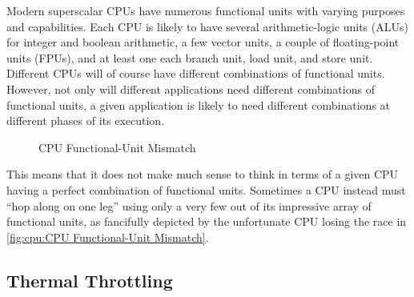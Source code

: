 Modern superscalar CPUs have numerous functional units with varying
purposes and capabilities.
Each CPU is likely to have several arithmetic-logic units (ALUs)
for integer and boolean arithmetic, a few vector units, a couple of
floating-point units (FPUs), and at least one each branch unit, load unit,
and store unit.
Different CPUs will of course have different combinations of functional
units.
However, not only will different applications need different combinations
of functional units, a given application is likely to need different
combinations at different phases of its execution.

\begin{figure}
\centering
{}
\caption{CPU Functional-Unit Mismatch}
\end{figure}

This means that it does not make much sense to think in terms of a given
CPU having a perfect combination of functional units.
Sometimes a CPU instead must ``hop along on one leg'' using only a
very few out of its impressive array of functional units, as fancifully
depicted by the unfortunate CPU losing the race in
\cref{fig:cpu:CPU Functional-Unit Mismatch}.

\subsection{Thermal Throttling}
\label{sec:cpu:Thermal Throttling}

